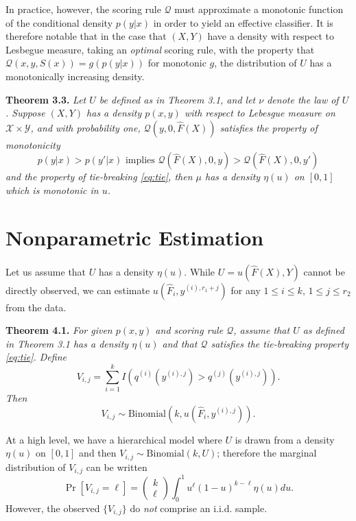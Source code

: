 \documentclass{article}
\begin{document}
In practice, however, the scoring rule $\mathcal{Q}$ must approximate a monotonic function of the conditional density $p(y|x)$
in order to yield an effective classifier.  It is therefore notable that in the case that $(X, Y)$ have a density with respect to Lesbegue measure,
taking an \emph{optimal} scoring rule,
with the property that $\mathcal{Q}(x, y, S(x)) = g(p(y|x))$ for monotonic $g$,
the distribution of $U$ has a monotonically increasing density.

\noindent\textbf{Theorem 3.3.} \emph{ Let $U$ be defined as in Theorem
  3.1, and let $\nu$ denote the law of $U$.  Suppose $(X, Y)$ has a density $p(x, y)$ with respect to 
  Lebesgue measure on $\mathcal{X} \times \mathcal{Y}$,
  and with probability one, $\mathcal{Q}(y, 0, \hat{F}(X))$ satisfies the property of monotonicity
  \[
  p(y|x) > p(y'|x) \text{ implies } \mathcal{Q}(\hat{F}(X), 0, y) > \mathcal{Q}(\hat{F}(X), 0, y')
  \]
  and the property of tie-breaking \eqref{eq:tie},
  then $\mu$ has a density $\eta(u)$ on $[0, 1]$ which is monotonic in $u$.
}

\section{Nonparametric Estimation}

Let us assume that $U$ has a density $\eta(u)$.
While $U = u(\hat{F}(X), Y)$ cannot be directly observed, we can estimate $u(\hat{F}_i, y^{(i), r_1 + j})$ for any $1 \leq i \leq k$,
$1 \leq j \leq r_2$ from the data.

\noindent\textbf{Theorem 4.1.}\emph{
For given $p(x, y)$ and scoring rule $\mathcal{Q}$, assume that $U$ as defined in Theorem 3.1 has a density $\eta(u)$
and that $\mathcal{Q}$ satisfies the tie-breaking property \eqref{eq:tie}.
Define
\[
V_{i, j} = \sum_{i=1}^k I(q^{(i)}(y^{(i), j}) > q^{(j)}(y^{(i), j})).
\]
Then
\[
V_{i, j} \sim \text{Binomial}(k, u(\hat{F}_i, y^{(i), j})).
\]}

At a high level, we have a hierarchical model where $U$ is drawn from a density $\eta(u)$ on $[0, 1]$
and then $V_{i, j} \sim \text{Binomial}(k, U)$;
therefore the marginal distribution of $V_{i, j}$ can be written
\[
\Pr[V_{i,j} = \ell] = \begin{pmatrix}
k \\ \ell
\end{pmatrix}
\int_0^1 u^\ell (1-u)^{k-\ell} \eta(u) du.
\]
However, the observed $\{V_{i, j}\}$ do \emph{not} comprise an i.i.d. sample.
\end{document}
